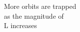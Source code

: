\documentclass[preview]{standalone}
\begin{document}
More orbits are trapped\\as the magnitude of\\L increases\\
\end{document}
